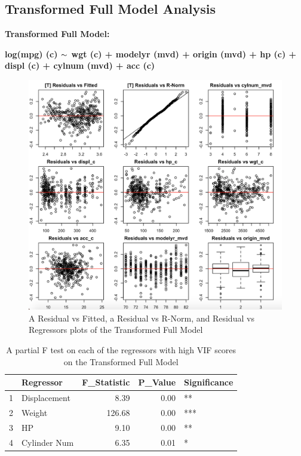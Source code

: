 \documentclass{article}
\newcommand{\mt}[1]{\ensuremath{#1}}
\newcommand{\tl}{\mt{\thicksim} }
\begin{document}
\clearpage 
\newpage

\subsection{Transformed Full Model Analysis}

\textbf{Transformed Full Model:}

\textbf{log(mpg) (c) \tl wgt (c) + modelyr (mvd) + origin (mvd) + hp (c) + displ (c) + cylnum (mvd) + acc (c)}

\begin{figure}[h]
	\centering
	\includegraphics[width=0.95\linewidth]{15-23t_resall}
	\caption[Residual Plots of the Transformed Full Model]
	{A Residual vs Fitted, a Residual vs R-Norm, and Residual vs Regressors plots of the Transformed Full Model}
\end{figure}

\clearpage
\newpage

\begin{table}[ht]
\centering
\begin{tabular}{rlrrl}
  \hline
 & Regressor & F\_Statistic & P\_Value & Significance \\ 
  \hline
1 & Displacement & 8.39 & 0.00 & ** \\ 
  2 & Weight & 126.68 & 0.00 & *** \\ 
  3 & HP & 9.10 & 0.00 & ** \\ 
  4 & Cylinder Num & 6.35 & 0.01 & * \\ 
   \hline
\end{tabular}
\caption{A partial F test on each of the regressors with high VIF scores on the Transformed Full Model}
\label{tab:partialfhighvif}
\end{table}
\end{document}
